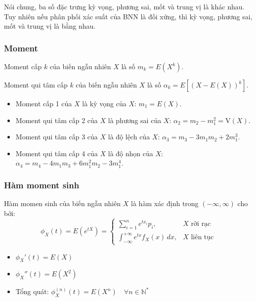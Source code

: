 \documentclass[12pt,a4paper]{article}
\begin{document}
\begin{luuy}
  Nói chung, ba số đặc trưng kỳ vọng, phương sai, mốt và trung vị là khác nhau. Tuy nhiên nếu phân phối xác suất của BNN là đối xứng, thì kỳ vọng, phương sai, mốt và trung vị là bằng nhau.
\end{luuy}

\subsubsection{Moment}

\begin{dinhnghia}[title={Moment cấp $k$ và moment qui tâm cấp $k$}]
  Moment cấp $k$ của biến ngẫu nhiên $X$ là số $m_k = E(X^k)$.

  Moment qui tâm cấp $k$ của biến ngẫu nhiên $X$ là số $\alpha_k = E[(X - E(X))^k]$.
\end{dinhnghia}

\begin{luuy}
\begin{itemize}
  \item Moment cấp 1 của $X$ là kỳ vọng của $X$: $m_1 = E(X)$.
  \item Moment qui tâm cấp 2 của $X$ là phương sai của $X$: $\alpha_2 = m_2 - m_1^2 = \mathrm{V}(X)$.
  \item Moment qui tâm cấp 3 của $X$ là độ lệch của $X$: $\alpha_3 = m_3 - 3m_1m_2 + 2m_1^3$.
  \item Moment qui tâm cấp 4 của $X$ là độ nhọn của $X$: $\alpha_4 = m_4 - 4m_1m_3 + 6m_1^2m_2 - 3m_1^4$.
\end{itemize}
\end{luuy}

\subsubsection{Hàm moment sinh}

\begin{dinhnghia}[title={Hàm moment sinh}]
Hàm momen sinh của biến ngẫu nhiên $X$ là hàm xác định trong $(-\infty, \infty)$ cho bởi:
\[
  \phi_X(t) = E(e^{tX}) = \begin{cases} \displaystyle\sum_{i=1}^n e^{tx_i} p_i, & X \text{ rời rạc} \\ \displaystyle\int_{-\infty}^{+\infty} e^{tx} f_X(x)\,dx, & X \text{ liên tục} \end{cases}   
\]
\end{dinhnghia}

\begin{tinhchat}
\begin{itemize}
  \item $\phi_X'(t) = E(X)$
  \item $\phi_X''(t) = E(X^2)$
  \item Tổng quát: $\phi_X^{(n)}(t) = E(X^n) \quad \forall n \in \mathbb{N}^*$
\end{itemize}
\end{tinhchat}
\end{document}
